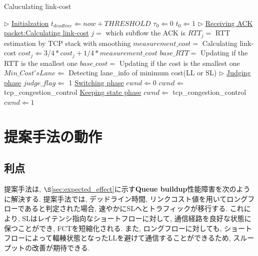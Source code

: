 \begin{algorithm}
\caption{Caluculating link-cost}
\label{alg1}
\begin{algorithmic}[1]
\STATE $\triangleright $ \underline{Initialzation}
\STATE $t_{deadline} \Leftarrow now + THRESHOLD$
\STATE $\tau_0 \Leftarrow 0$
\STATE $t_{0} \Leftarrow 1$
\STATE $\triangleright $ \underline{Receiving ACK packet:Calculating link-cost}
\STATE $j = $ which subflow the ACK is
\STATE $RTT_j = $ RTT estimation by TCP stack with smoothing
\STATE $measurement\_cost = $ Calculating link-cost
\STATE $cost_j \Leftarrow 3/4  \ast cost_j + 1/4 \ast measurement\_cost$
\STATE $base\_RTT = $ Updating if the RTT is the smallest one
\STATE $base\_cost = $ Updating if the cost is the smallest one
\STATE $Min\_Cost's Lane \Leftarrow$ Detecting lane\_info of minimum cost(LL
or SL)
\ENDFOR
\STATE $\triangleright $ \underline{Judging phase}
\STATE $judge\_flag \Leftarrow $ 1
\ENDIF
{}
\STATE {$\triangleright$} \underline{Switching phase}
    \STATE $cwnd \Leftarrow 0$
    \ELSE
    \STATE $cwnd \Leftarrow $ tcp\_congestion\_control
    \ENDIF
\ELSE
\STATE {$\triangleright$} \underline{Keeping state phase}
    \STATE $cwnd \Leftarrow $ tcp\_congestion\_control
    \ELSE
    \STATE $cwnd \Leftarrow 1$
    \ENDIF
\ENDIF
\end{algorithmic}
\end{algorithm}

\section{提案手法の動作}

\subsection{利点}
提案手法は, $\S$\ref{sec:expected_effect}に示す{\bf Queue buildup}性能障害を次のように解決する. 
提案手法では, デッドライン時間, リンクコスト値を用いてロングフローであると判定された場合, 速やかにSLへとトラフィックが移行する. 
これにより, SLはレイテンシ指向なショートフローに対して, 通信経路を良好な状態に保つことができ, FCTを短縮化される. 
また, ロングフローに対しても, ショートフローによって輻輳状態となったLLを避けて通信することができるため, スループットの改善が期待できる. 

